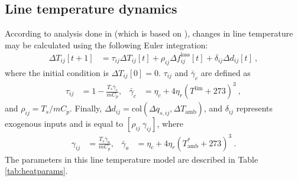 \documentclass[conference]{IEEEtran}
\begin{document}
\subsection{Line temperature dynamics}
According to analysis done in \cite{almassalkhi2014} (which is based on \cite{ieee2007}), changes in line temperature may be calculated using the following Euler integration:
\begin{align}
\label{TD:euler}
\Delta T_{ij}[t+1] &= \tau_{ij}\Delta T_{ij}[t] + \rho_{ij}\Delta f_{ij}^\text{loss}[t] + \delta_{ij}\Delta d_{ij}[t]~,
\end{align}
where the initial condition is $\Delta T_{ij}[0] = 0$. $\tau_{ij}$ and $\bar{\gamma}_c$ are defined as
\begin{align}
\tau_{ij} &= 1 - \frac{T_s\bar{\gamma}_c}{mC_p},& \bar{\gamma}_c &= \eta_c + 4\eta_r(T^\text{lim} + 273)^3~,
\end{align}
and $\rho_{ij} = T_s/mC_p$. Finally, $\Delta d_{ij} = \text{col}(\Delta q_{s,ij},\Delta T_\text{amb})$, and $\delta_{ij}$ represents exogenous inputs and is equal to $[\rho_{ij}~\gamma_{ij}]$, where
\begin{align}
\gamma_{ij} &= \frac{T_s\bar{\gamma}_a}{mC_p}, & \bar{\gamma}_a &= \eta_c + 4\eta_r(T_\text{amb}^* + 273)^3~.
\end{align}
The parameters in this line temperature model are described in Table \ref{tab:heatparams}.

\newcommand{\splitcell}[2][c]{%
  \begin{tabular}[#1]{@{}c@{}}#2\end{tabular}}
  
\end{document}
